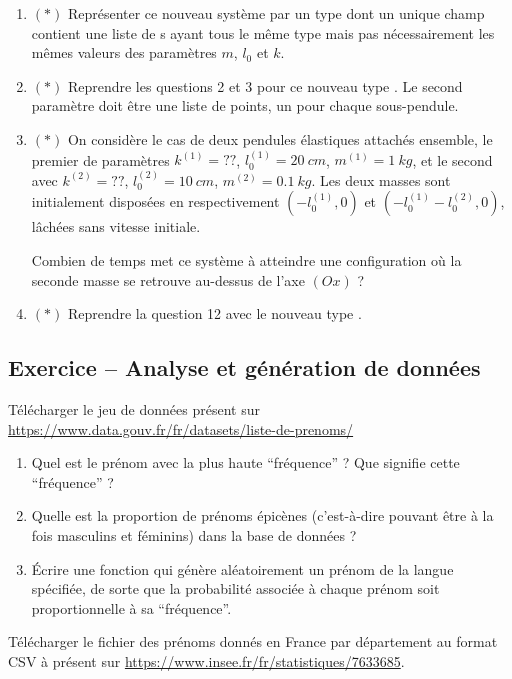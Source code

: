 \documentclass{article}
\newcounter{loop}
\newcounter{numEx}
\newcommand{\exo}[1]{
	\stepcounter{numEx}
	\setcounter{loop}{0}
	\subsection*{Exercice \arabic{numEx} -- #1}
}
\newcommand{\der}[2]{#1^{\ensuremath{\left(#2\right)}}}
\begin{document}
\begin{enumerate}[resume]
	\item $(*)$ Représenter ce nouveau système par un type  dont un unique champ contient une liste de s ayant tous le même type mais pas nécessairement les mêmes valeurs des paramètres $m$, $l_0$ et $k$.
	\item $(*)$ Reprendre les questions 2 et 3 pour ce nouveau type . Le second paramètre  doit être une liste de points, un pour chaque sous-pendule.
	\item $(*)$ On considère le cas de deux pendules élastiques attachés ensemble, le premier de paramètres $\der k1 = ??$, $\der{l_0}1 = \qty{20}{cm}$, $\der m1 = \qty{1}{kg}$, et le second avec $\der k2 = ??$, $\der{l_0}2 = \qty{10}{cm}$, $\der m2 = \qty{0.1}{kg}$. Les deux masses sont initialement disposées en respectivement $(-\der{l_0}1, 0)$ et $(-\der{l_0}1-\der{l_0}2, 0)$, lâchées sans vitesse initiale.

	Combien de temps met ce système à atteindre une configuration où la seconde masse se retrouve au-dessus de l'axe $(Ox)$ ?
	\item $(*)$ Reprendre la question 12 avec le nouveau type .
\end{enumerate}

\exo{Analyse et génération de données}

Télécharger le jeu de données présent sur \url{https://www.data.gouv.fr/fr/datasets/liste-de-prenoms/}

\begin{enumerate}
	\item Quel est le prénom avec la plus haute ``fréquence'' ? Que signifie cette ``fréquence'' ?
	\item Quelle est la proportion de prénoms épicènes (c'est-à-dire pouvant être à la fois masculins et féminins) dans la base de données ?
	\item Écrire une fonction  qui génère aléatoirement un prénom de la langue spécifiée, de sorte que la probabilité associée à chaque prénom soit proportionnelle à sa ``fréquence''.
\end{enumerate}

Télécharger le fichier des prénoms donnés en France par département au format CSV à présent sur \url{https://www.insee.fr/fr/statistiques/7633685}.
\end{document}
